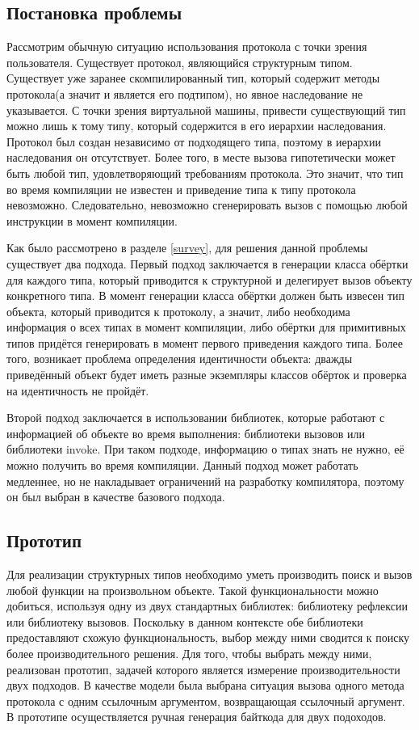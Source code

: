 
\subsection{Постановка проблемы}

Рассмотрим обычную ситуацию использования протокола с точки зрения пользователя. Существует протокол, являющийся структурным типом. Существует уже заранее скомпилированный тип, который содержит методы протокола(а значит и является его подтипом), но явное наследование не указывается. С точки зрения виртуальной машины, привести существующий тип можно лишь к тому типу, который содержится в его иерархии наследования. Протокол был создан независимо от подходящего типа, поэтому в иерархии наследования он отсутствует. Более того, в месте вызова гипотетически может быть любой тип, удовлетворяющий требованиям протокола. Это значит, что тип во время компиляции не известен и приведение типа к типу протокола невозможно. Следовательно, невозможно сгенерировать вызов с помощью любой инструкции в момент компиляции.

Как было рассмотрено в разделе \ref{survey}, для решения данной проблемы существует два подхода. Первый подход заключается в генерации класса обёртки для каждого типа, который приводится к структурной и делегирует вызов объекту конкретного типа. В момент генерации класса обёртки должен быть извесен тип объекта, который приводится к протоколу, а значит, либо необходима информация о всех типах в момент компиляции, либо обёртки для примитивных типов придётся генерировать в момент первого приведения каждого типа. Более того, возникает проблема определения идентичности объекта: дважды приведённый объект будет иметь разные экземпляры классов обёрток и проверка на идентичность не пройдёт.

Второй подход заключается в использовании библиотек, которые работают с информацией об объекте во время выполнения: библиотеки вызовов или библиотеки invoke. При таком подходе, информацию о типах знать не нужно, её можно получить во время компиляции. Данный подход может работать медленнее, но не накладывает ограничений на разработку компилятора, поэтому он был выбран в качестве базового подхода.

\subsection{Прототип}
Для реализации структурных типов необходимо уметь производить поиск и вызов любой функции на произвольном объекте. Такой функциональности можно добиться, используя одну из двух стандартных библиотек: библиотеку рефлексии или библиотеку вызовов. Поскольку в данном контексте обе библиотеки предоставляют схожую функциональность, выбор между ними сводится к поиску более производительного решения. Для того, чтобы выбрать между ними, реализован прототип, задачей которого является измерение производительности двух подходов. В качестве модели была выбрана ситуация вызова одного метода протокола с одним ссылочным аргументом, возвращающая ссылочный аргумент. В прототипе осуществляется ручная генерация байткода для двух подоходов.

